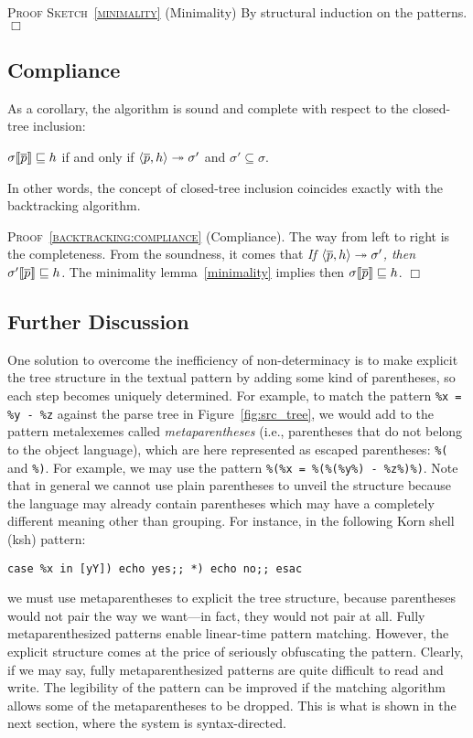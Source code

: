 \noindent\textsc{Proof Sketch~\ref{minimality}} (Minimality) By
structural induction on the patterns.\(\Box\)

\subsection{Compliance}

As a corollary, the algorithm is sound and complete with respect to
the closed\hyp{}tree inclusion:
\begin{cor}[Compliance]\hfill
\label{backtracking:compliance}
\begin{center}
\(\subst{\overline{p}}{\sigma} \sqsubseteq h\) if and only if
\(\smat{h}{\overline{p}} \twoheadrightarrow \sigma'\) 
and  \(\sigma' \subseteq \sigma\).
\end{center}
\end{cor}
\noindent In other words, the concept of closed\hyp{}tree inclusion
coincides exactly with the backtracking algorithm.

\noindent\textsc{Proof~\ref{backtracking:compliance}}
(Compliance). The way from left to right is the completeness. From the
soundness, it comes that
\emph{If \(\smat{h}{\overline{p}} \twoheadrightarrow \sigma'\), then
\(\subst{\overline{p}}{\sigma'} \sqsubseteq h\).}
The minimality lemma~\ref{minimality} implies then
\(\subst{\overline{p}}{\sigma} \sqsubseteq h\). \(\Box\)

\subsection{Further Discussion}

One solution to overcome the inefficiency of non\hyp{}determinacy is
to make explicit the tree structure in the textual pattern by adding
some kind of parentheses, so each step becomes uniquely
determined. For example, to match the pattern \texttt{\%x = \%y - \%z}
against the parse tree in Figure~\ref{fig:src_tree}, we would add to
the pattern meta\-lexemes called \emph{meta\-parentheses} (i.e.,
parentheses that do not belong to the object language), which are here
represented as escaped parentheses: \texttt{\%(} and \texttt{\%)}. For
example, we may use the pattern \texttt{\%(\%x = \%(\%(\%y\%) -
\%z\%)\%)}. Note that in general we cannot use plain parentheses to
unveil the structure because the language may already contain
parentheses which may have a completely different meaning other than
grouping. For instance, in the following \textsf{Korn shell}
(\textsf{ksh}) pattern:
\begin{verbatim} 
case %x in [yY]) echo yes;; *) echo no;; esac
\end{verbatim}
we must use meta\-parentheses to explicit the tree structure, because
parentheses would not pair the way we want---in fact, they would not
pair at all. Fully meta\-parenthesized patterns enable
linear\hyp{}time pattern matching. However, the explicit structure
comes at the price of seriously obfuscating the pattern. Clearly, if
we may say, fully meta\-parenthesized patterns are quite difficult to
read and write. The legibility of the pattern can be improved if the
matching algorithm allows some of the meta\-parentheses to be
dropped. This is what is shown in the next section, where the system
is syntax\hyp{}directed.
